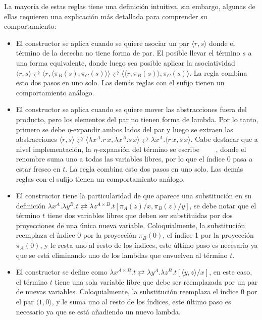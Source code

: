 La mayoría de estas reglas tiene una definición intuitiva, sin embargo, algunas de ellas requieren una explicación más detallada para comprender su comportamiento:
\begin{itemize}
	\item El constructor  se aplica cuando se quiere asociar un par $\langle r, s \rangle$ donde el término de la derecha no tiene forma de par.
	El posible llevar el término $s$ a una forma equivalente, donde luego sea posible aplicar la asociatividad $\langle r, s \rangle \rightleftarrows \langle r, \langle \pi_B(s), \pi_C(s) \rangle \rangle \rightleftarrows \langle \langle r, \pi_B(s) \rangle, \pi_C(s) \rangle$.
	La regla  combina esto dos pasos en uno solo.
	Las demás reglas con el sufijo  tienen un comportamiento análogo.
	
	\item El constructor  se aplica cuando se quiere mover las abstracciones fuera del producto, pero los elementos del par no tienen forma de lambda.
	Por lo tanto, primero se debe $\eta$-expandir ambos lados del par y luego se extraen las abstracciones
	$\langle r, s \rangle \rightleftarrows \langle \lambda x^A.r\, x, \lambda x^A.s\, x \rangle \rightleftarrows \lambda x^A. \langle r\, x, s\, x \rangle$.
	Cabe destacar que a nivel implementación, la $\eta$-expansión del término  se escribe ~~~~, donde el renombre suma uno a todas las variables libres, por lo que el índice 0 pasa a estar fresco en $t$.
	La regla  combina esto dos pasos en uno solo.
	Las demás reglas con el sufijo  tienen un comportamiento análogo.
	
	\item El constructor  tiene la particularidad de que aparece una substitución en su definición $\lambda x^A. \lambda y^B. t \rightleftarrows \lambda z^{A \times B}. t[\pi_A(z)/x, \pi_B(z)/y]$, se debe notar que el término $t$ tiene dos variables libres que deben ser substituidas por dos proyecciones de una única nueva variable.
	Coloquialmente, la substitución  reemplaza el índice 0 por la proyección $\pi_B(0)$, el índice 1 por la proyección $\pi_A(0)$, y le resta uno al resto de los índices, este último paso es necesario ya que se está eliminando uno de los lambdas que envuelven al término $t$.
	
	\item El constructor  se define como $\lambda x^{A \times B}. t \rightleftarrows \lambda y^A. \lambda z^B. t[\langle y, z \rangle/x]$, en este caso, el término $t$ tiene una sola variable libre que debe ser reemplazada por un par de nuevas variables.
	Coloquialmente, la substitución  reemplaza el índice 0 por el par $\langle 1, 0 \rangle$, y le suma uno al resto de los índices, este último paso es necesario ya que se está añadiendo un nuevo lambda.
	

\end{itemize}
